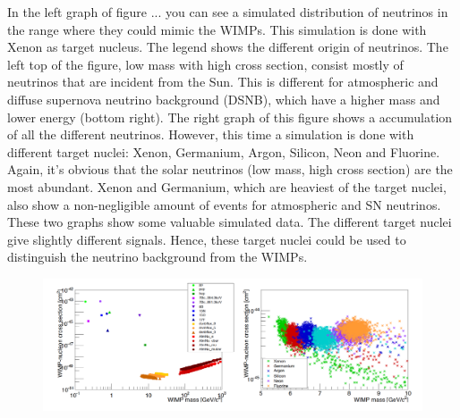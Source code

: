 \documentclass{article}
\begin{document}
In the left graph of figure ... you can see a simulated distribution of neutrinos in the range where they could mimic the WIMPs. This simulation is done with Xenon as target nucleus. The legend shows the different origin of neutrinos. The left top of the figure, low mass with high cross section, consist mostly of neutrinos that are incident from the Sun. This is different for atmospheric and diffuse supernova neutrino background (DSNB), which have a higher mass and lower energy (bottom right).
The right graph of this figure shows a accumulation of all the different neutrinos. However, this time a simulation is done with different target nuclei: Xenon, Germanium, Argon, Silicon, Neon and Fluorine. Again, it's obvious that the solar neutrinos (low mass, high cross section) are the most abundant. Xenon and Germanium, which are heaviest of the target nuclei, also show a non-negligible amount of events for atmospheric and SN neutrinos. 
These two graphs show some valuable simulated data. The different target nuclei give slightly different signals. Hence, these target nuclei could be used to distinguish the neutrino background from the WIMPs.
\begin{figure}[h]
    \centering
    \includegraphics[width=\textwidth]{Neutrinos3.png}
    \caption{\cite{Billard:2013qya}}
\end{figure}







\FloatBarrier

\
\newpage


\end{document}
